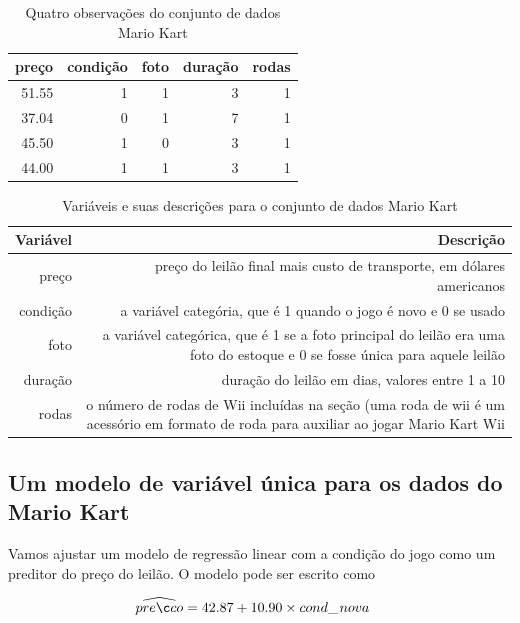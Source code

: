 \documentclass[
]{book}
\theoremstyle{definition}
\theoremstyle{definition}
\theoremstyle{definition}
\theoremstyle{definition}
\theoremstyle{remark}
\begin{document}
\begin{table}

\caption{\label{tab:marioKartDataMatrix}Quatro observações do conjunto de dados Mario Kart}
\centering
\begin{tabular}[t]{r|r|r|r|r}
\hline
preço & condição & foto & duração & rodas\\
\hline
51.55 & 1 & 1 & 3 & 1\\
\hline
37.04 & 0 & 1 & 7 & 1\\
\hline
45.50 & 1 & 0 & 3 & 1\\
\hline
44.00 & 1 & 1 & 3 & 1\\
\hline
\end{tabular}
\end{table}

\begin{table}

\caption{\label{tab:marioKartVariables}Variáveis e suas descrições para o conjunto de dados Mario Kart}
\centering
\begin{tabular}[t]{r|r}
\hline
Variável & Descrição\\
\hline
preço & preço do leilão final mais custo de transporte, em dólares americanos\\
\hline
condição & a variável categória, que é 1 quando o jogo é novo e 0 se usado\\
\hline
foto & a variável categórica, que é 1 se a foto principal do leilão era uma foto do estoque e 0 se fosse única para aquele leilão\\
\hline
duração & duração do leilão em dias, valores entre 1 a 10\\
\hline
rodas & o número de rodas de Wii incluídas na seção (uma roda de wii é um acessório em formato de roda para auxiliar ao jogar Mario Kart Wii\\
\hline
\end{tabular}
\end{table}

\hypertarget{twoSingleVariableModelsForMarioKartData}{%
\subsection{Um modelo de variável única para os dados do Mario Kart}\label{twoSingleVariableModelsForMarioKartData}}

Vamos ajustar um modelo de regressão linear com a condição do jogo como um preditor do preço do leilão. O modelo pode ser escrito como

\begin{align*}
\widehat{preço} &= 42.87 + 10.90\times cond\_\hspace{0.3mm}nova
\end{align*}
\end{document}
